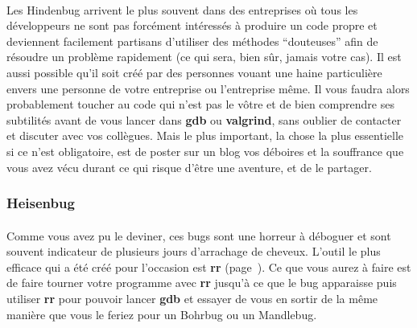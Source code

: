 \paragraph{} Les Hindenbug arrivent le plus souvent dans des entreprises où
tous les développeurs ne sont pas forcément intéressés à produire un code
propre et deviennent facilement partisans d'utiliser des méthodes ``douteuses''
afin de résoudre un problème rapidement (ce qui sera, bien sûr, jamais votre
cas). Il est aussi possible qu'il soit créé par des personnes vouant une haine
particulière envers une personne de votre entreprise ou l'entreprise même. Il
vous faudra alors probablement toucher au code qui n'est pas le vôtre et de
bien comprendre ses subtilités avant de vous lancer dans \textbf{gdb} ou
\textbf{valgrind}, sans oublier de contacter et discuter avec vos collègues.
Mais le plus important, la chose la plus essentielle si ce n'est obligatoire,
est de poster sur un blog vos déboires et la souffrance que vous avez vécu
durant ce qui risque d'être une aventure, et de le partager.

\subsubsection{Heisenbug}

\paragraph{} Comme vous avez pu le deviner, ces bugs sont une horreur à
déboguer et sont souvent indicateur de plusieurs jours d'arrachage de cheveux.
L'outil le plus efficace qui a été créé pour l'occasion est \textbf{rr}
(page~\pageref{part:rr}). Ce que vous aurez à faire est de faire tourner votre
programme avec \textbf{rr} jusqu'à ce que le bug apparaisse puis utiliser
\textbf{rr} pour pouvoir lancer \textbf{gdb} et essayer de vous en sortir de la
même manière que vous le feriez pour un Bohrbug ou un Mandlebug.
